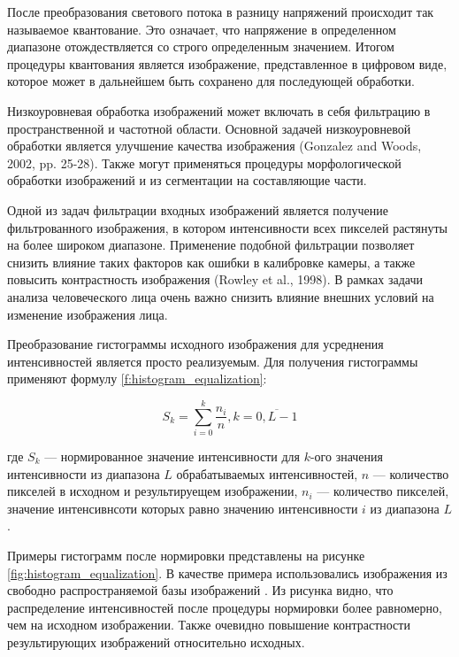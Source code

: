 После преобразования светового потока в разницу напряжений происходит так называемое квантование. Это означает, что напряжение в определенном диапазоне отождествляется со строго определенным значением. Итогом процедуры квантования является изображение, представленное в цифровом виде, которое может в дальнейшем быть сохранено для последующей обработки.

Низкоуровневая обработка изображений может включать в себя фильтрацию в пространственной и частотной области. Основной задачей низкоуровневой обработки является улучшение качества изображения (Gonzalez and Woods, 2002, pp. 25-28). Также могут применяться процедуры морфологической обработки изображений и из сегментации на составляющие части.

Одной из задач фильтрации входных изображений является получение фильтрованного изображения, в котором интенсивности всех пикселей растянуты на более широком диапазоне. Применение подобной фильтрации позволяет снизить влияние таких факторов как ошибки в калибровке камеры, а также повысить контрастность изображения (Rowley et al., 1998). В рамках задачи анализа человеческого лица очень важно снизить влияние внешних условий на изменение изображения лица.

Преобразование гистограммы исходного изображения для усреднения интенсивностей является просто реализуемым. Для получения гистограммы применяют формулу \ref{f:histogram_equalization}:

\begin{equation}
	\label{f:histogram_equalization}
	S_k = \sum_{i=0}^{k}\frac{n_i}{n}, k=\overline{0,L-1}
\end{equation}

где ${S_k}$ --- нормированное значение интенсивности для $k$-ого значения интенсивности из диапазона $L$ обрабатываемых интенсивностей, $n$ --- количество пикселей в исходном и результируещем изображении, $n_i$ --- количество пикселей, значение интенсивнсоти которых равно значению интенсивности $i$ из диапазона $L$.



Примеры гистограмм после нормировки представлены на рисунке \ref{fig:histogram_equalization}. В качестве примера использовались изображения из свободно распространяемой базы изображений \cite{Milborrow10}. Из рисунка видно, что распределение интенсивностей после процедуры нормировки более равномерно, чем на исходном изображении. Также очевидно повышение контрастности результирующих изображений относительно исходных.

